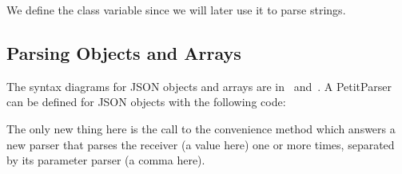 \documentclass[a4paper,10pt,twoside]{book}
\begin{document}
We define the  class variable since we will later
use it to parse strings.

\subsection{Parsing Objects and Arrays}

The syntax diagrams for JSON objects and arrays are
in~ and~. A PetitParser can
be defined for JSON objects with the following code:


The only new thing here is the call to the 
convenience method which answers a new parser that parses the receiver
(a value here) one or more times, separated by its parameter parser (a
comma here).
\end{document}
